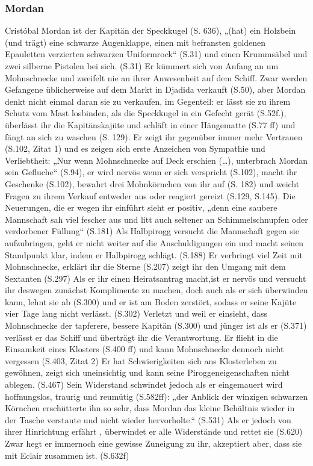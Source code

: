 \subsubsection{Mordan}
Cristóbal Mordan ist der Kapitän der Speckkugel (S. 636), „(hat) ein Holzbein (und trägt) eine schwarze Augenklappe, einen mit befransten goldenen Epauletten verzierten schwarzen Uniformrock“ (S.31) und einen  Krummsäbel und zwei silberne Pistolen bei sich. (S.31) Er kümmert sich von Anfang an um Mohnschnecke und zweifelt nie an ihrer Anwesenheit auf dem Schiff. Zwar werden Gefangene üblicherweise auf dem Markt in Djadida verkauft (S.50), aber Mordan denkt nicht einmal daran sie zu verkaufen, im Gegenteil:  er lässt sie zu ihrem Schutz vom Mast losbinden, als die Speckkugel in ein Gefecht gerät (S.52f.), überlässt ihr die Kapitänskajüte und schläft in einer Hängematte (S.77 ff) und fängt an sich zu waschen (S. 129). Er zeigt ihr gegenüber immer mehr Vertrauen (S.102, Zitat 1) und es zeigen sich erste Anzeichen von Sympathie und Verliebtheit: „Nur wenn Mohnschnecke auf Deck erschien (…), unterbrach Mordan sein Gefluche“ (S.94), er wird nervös wenn er sich verspricht (S.102), macht ihr Geschenke (S.102), bewahrt drei Mohnkörnchen von ihr auf (S. 182) und weicht Fragen zu ihrem Verkauf entweder aus oder reagiert gereizt (S.129, S.145). Die Neuerungen, die er wegen ihr einführt sieht er positiv, „denn eine saubere Mannschaft sah viel fescher aus und litt auch seltener an Schimmelschnupfen oder verdorbener Füllung“ (S.181) Als Halbpirogg versucht die Mannschaft gegen sie aufzubringen, geht er nicht weiter auf die Anschuldigungen ein und macht seinen Standpunkt klar, indem er Halbpirogg schlägt. (S.188) Er verbringt viel Zeit mit Mohnschnecke, erklärt ihr die Sterne (S.207) zeigt ihr den Umgang mit dem Sextanten (S.297) Als er ihr einen Heiratsantrag macht,ist er nervös und versucht ihr deswegen zunächst Komplimente zu machen, doch auch als er sich überwinden kann,  lehnt sie ab (S.300) und er ist am Boden zerstört, sodass er seine Kajüte vier Tage lang nicht verlässt. (S.302) Verletzt und weil er einsieht, dass Mohnschnecke der tapferere, bessere Kapitän (S.300) und jünger ist als er (S.371) verlässt er das Schiff und überträgt ihr die Verantwortung. Er flieht in die Einsamkeit eines Klosters (S.400 ff) und kann Mohnschnecke dennoch nicht vergessen (S.403, Zitat 2) Er hat Schwierigkeiten sich ans Klosterleben zu gewöhnen, zeigt sich uneinsichtig und kann seine Piroggeneigenschaften nicht ablegen. (S.467) Sein Widerstand schwindet jedoch als er eingemauert wird hoffnungslos, traurig und reumütig (S.582ff): „der Anblick der winzigen schwarzen Körnchen erschütterte ihn so sehr, dass Mordan das kleine Behältnis wieder in der Tasche verstaute und nicht wieder hervorholte.“ (S.531) Als er jedoch von ihrer Hinrichtung erfährt , überwindet er alle Widerstände und rettet sie (S.620) Zwar hegt er immernoch eine gewisse Zuneigung zu ihr, akzeptiert aber, dass sie mit Eclair zusammen ist. (S.632f)


